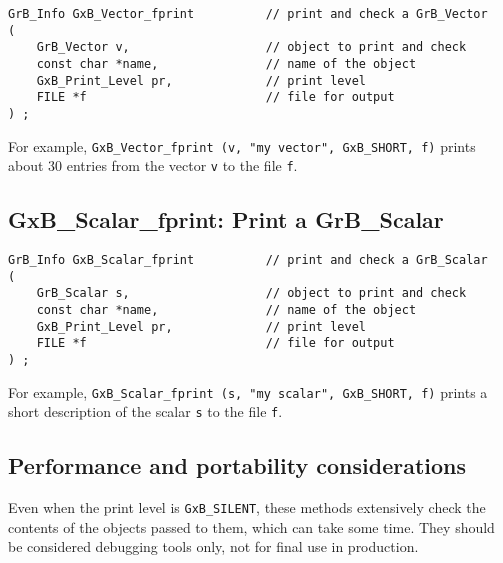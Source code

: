 \documentclass[12pt]{article}
\begin{document}
\begin{mdframed}[userdefinedwidth=6in]
{\footnotesize
\begin{verbatim}
GrB_Info GxB_Vector_fprint          // print and check a GrB_Vector
(
    GrB_Vector v,                   // object to print and check
    const char *name,               // name of the object
    GxB_Print_Level pr,             // print level
    FILE *f                         // file for output
) ;
\end{verbatim} } \end{mdframed}

For example, \verb'GxB_Vector_fprint (v, "my vector", GxB_SHORT, f)'
prints about 30 entries from the vector \verb'v' to the file \verb'f'.

\subsection{{\sf GxB\_Scalar\_fprint:} Print a {\sf GrB\_Scalar}}

\begin{mdframed}[userdefinedwidth=6in]
{\footnotesize
\begin{verbatim}
GrB_Info GxB_Scalar_fprint          // print and check a GrB_Scalar
(
    GrB_Scalar s,                   // object to print and check
    const char *name,               // name of the object
    GxB_Print_Level pr,             // print level
    FILE *f                         // file for output
) ;
\end{verbatim} } \end{mdframed}

For example, \verb'GxB_Scalar_fprint (s, "my scalar", GxB_SHORT, f)'
prints a short description of the scalar \verb's' to the file \verb'f'.

\newpage
\subsection{Performance and portability considerations}

Even when the print level is \verb'GxB_SILENT', these methods extensively check
the contents of the objects passed to them, which can take some time.  They
should be considered debugging tools only, not for final use in production.
\end{document}
